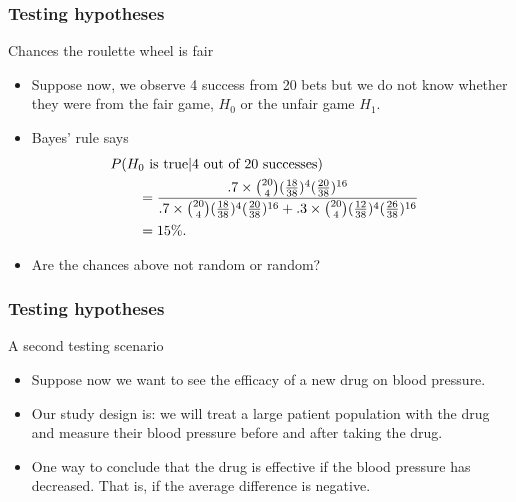 \documentclass[handout]{beamer}
\begin{document}

   \begin{frame} \frametitle{Testing hypotheses}

   \begin{block}
   {Chances the roulette wheel is fair}
   \begin{itemize}

   \item Suppose now, we observe 4 success from 20 bets but we
   do not know whether they were from the fair game, $H_0$ or
   the unfair game $H_1$.

   \item Bayes' rule says
   $$
   \begin{aligned}
   \lefteqn{P(\text{$H_0$ is true} | \text{4 out of 20 successes})} \\
    &  \qquad =
   \frac{.7 \times \binom{20}{4} (\frac{18}{38})^4 (\frac{20}{38})^{16}}{.7 \times \binom{20}{4} (\frac{18}{38})^4 (\frac{20}{38})^{16} + .3 \times \binom{20}{4} (\frac{12}{38})^4 (\frac{26}{38})^{16}} \\
   & \qquad = 15\%.
   \end{aligned}
   $$
   \item Are the chances above {\color{blue} not random} or {\color{orange} random}?
   \end{itemize}
   \end{block}
   \end{frame}


   \begin{frame} \frametitle{Testing hypotheses}

   \begin{block}
   {A second testing scenario}
   \begin{itemize}

   \item Suppose now we want to see the efficacy of a
   new drug on blood pressure.

   \item Our study design is: we will treat
   a large patient population with the drug and measure their
   blood pressure before and after taking the drug.

   \item One way to conclude that the drug is effective if the blood pressure has decreased. That is,
   if the average difference is negative.

   \end{itemize}
   \end{block}
   \end{frame}
\end{document}
